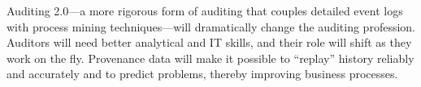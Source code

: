 Auditing 2.0—a more rigorous form of auditing that couples detailed event logs with process mining techniques—will dramatically change the auditing profession. Auditors will need better analytical and IT skills, and their role will shift as they work on the fly. Provenance data will make it possible to “replay” history reliably and accurately and to predict problems, thereby improving business processes.